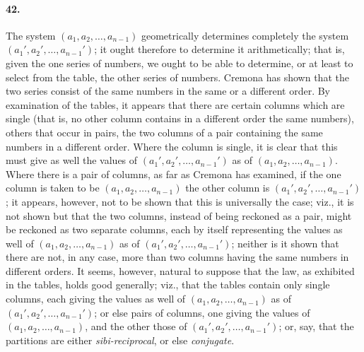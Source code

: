 \documentclass[11pt]{article}
\begin{document}
\bigskip


\paragraph{42.}
The system $(a_{1},a_{2},\ldots,a_{n-1})$ geometrically determines completely
the system $(a_{1}',a_{2}',\ldots,a_{n-1}')$; it ought therefore to determine
it arithmetically; that is, given the one series of numbers, we ought to
be able to determine, or at least to select from the table, the other
series of numbers. Cremona has shown that the two series consist of the
same numbers in the same or a different order. By examination of the
tables, it appears that there are certain columns which are single (that
is, no other column contains in a different order the same numbers),
others that occur in pairs, the two columns of a pair containing the same
numbers in a different order. Where the column is single, it is clear
that this must give as well the values of $(a_{1}',a_{2}',\ldots,a_{n-1}')$
as of $(a_{1},a_{2},\ldots,a_{n-1})$. Where there is a pair of columns, as
far as Cremona has examined, if the one column is taken to be
$(a_{1},a_{2},\ldots,a_{n-1})$ the other column is
$(a_{1}',a_{2}',\ldots,a_{n-1}')$; it appears, however, not to be shown
that this is universally the case; viz., it is not shown but that the two
columns, instead of being reckoned as a pair, might be reckoned as two
separate columns, each by itself representing the values as well of
$(a_{1},a_{2},\ldots,a_{n-1})$ as of $(a_{1}',a_{2}',\ldots,a_{n-1}')$;
neither is it shown that there are not, in any case, more than two
columns having the same numbers in different orders. It seems, however,
natural to suppose that the law, as exhibited in the tables, holds good
generally; viz., that the tables contain only single columns, each giving
the values as well of $(a_{1},a_{2},\ldots,a_{n-1})$ as of
$(a_{1}',a_{2}',\ldots,a_{n-1}')$; or else pairs of columns, one giving
the values of $(a_{1},a_{2},\ldots,a_{n-1})$, and the other those of
$(a_{1}',a_{2}',\ldots,a_{n-1}')$; or, say, that the partitions are
either \textit{sibi-reciprocal}, or else \textit{conjugate}.

\medskip
\end{document}
